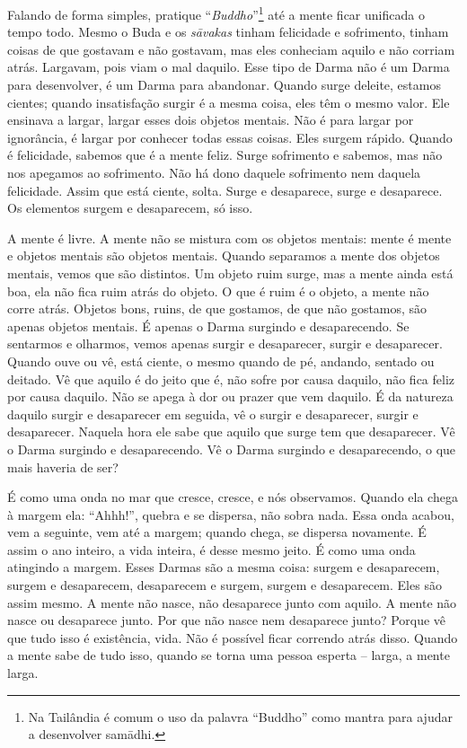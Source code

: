 Falando de forma simples, pratique “\textit{Buddho}”\footnote{Na
Tailândia é comum o uso da palavra “Buddho” como mantra para ajudar a
desenvolver samādhi.} até a mente ficar unificada o tempo todo. Mesmo
o Buda e os \textit{sāvakas} tinham felicidade e sofrimento, tinham
coisas de que gostavam e não gostavam, mas eles conheciam aquilo e não
corriam atrás. Largavam, pois viam o mal daquilo. Esse tipo de Darma
não é um Darma para desenvolver, é um Darma para abandonar. Quando
surge deleite, estamos cientes; quando insatisfação surgir é a mesma
coisa, eles têm o mesmo valor. Ele ensinava a largar, largar esses dois
objetos mentais. Não é para largar por ignorância, é largar por
conhecer todas essas coisas. Eles surgem rápido. Quando é felicidade,
sabemos que é a mente feliz. Surge sofrimento e sabemos, mas não nos
apegamos ao sofrimento. Não há dono daquele sofrimento nem daquela
felicidade. Assim que está ciente, solta. Surge e desaparece, surge e
desaparece. Os elementos surgem e desaparecem, só isso. 

A mente é livre. A mente não se mistura com os objetos mentais:
mente é mente e objetos mentais são objetos mentais. Quando separamos a
mente dos objetos mentais, vemos que são distintos. Um objeto ruim
surge, mas a mente ainda está boa, ela não fica ruim atrás do objeto. O
que é ruim é o objeto, a mente não corre atrás. Objetos bons, ruins, de
que gostamos, de que não gostamos, são apenas objetos mentais. É apenas
o Darma surgindo e desaparecendo. Se sentarmos e olharmos, vemos apenas
surgir e desaparecer, surgir e desaparecer. Quando ouve ou vê, está
ciente, o mesmo quando de pé, andando, sentado ou deitado. Vê que
aquilo é do jeito que é, não sofre por causa daquilo, não fica feliz
por causa daquilo. Não se apega à dor ou prazer que vem daquilo. É da
natureza daquilo surgir e desaparecer em seguida, vê o surgir e
desaparecer, surgir e desaparecer. Naquela hora ele sabe que aquilo que
surge tem que desaparecer. Vê o Darma surgindo e desaparecendo. Vê o
Darma surgindo e desaparecendo, o que mais haveria de ser? 

É como uma onda no mar que cresce, cresce, e nós observamos. Quando
ela chega à margem ela: “Ahhh!”, quebra e se dispersa, não sobra nada.
Essa onda acabou, vem a seguinte, vem até a margem; quando chega, se
dispersa novamente. É assim o ano inteiro, a vida inteira, é desse
mesmo jeito. É como uma onda atingindo a margem. Esses Darmas são a
mesma coisa: surgem e desaparecem, surgem e desaparecem, desaparecem e
surgem, surgem e desaparecem. Eles são assim mesmo. A mente não nasce,
não desaparece junto com aquilo. A mente não nasce ou desaparece junto.
Por que não nasce nem desaparece junto? Porque vê que tudo isso é
existência, vida. Não é possível ficar correndo atrás disso. Quando a
mente sabe de tudo isso, quando se torna uma pessoa esperta – larga, a
mente larga. 

